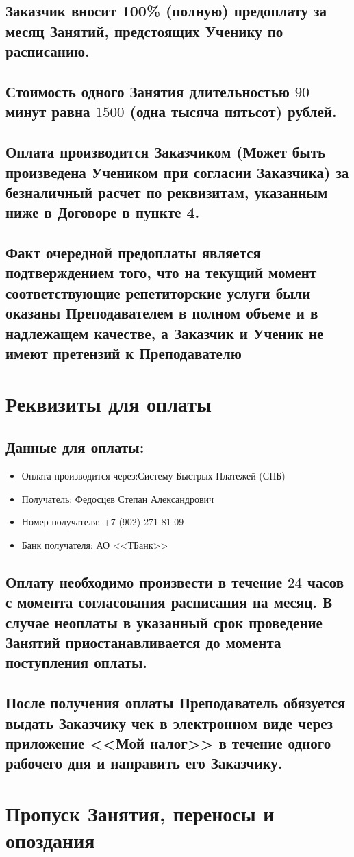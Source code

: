 \documentclass[a4paper,12pt]{article}
\begin{document}
\subsection{Заказчик вносит 100\% (полную) предоплату за месяц Занятий, предстоящих Ученику по расписанию.}
\subsection{Стоимость одного Занятия длительностью $90$ минут равна $1500$ (одна тысяча пятьсот) рублей.}

\subsection{Оплата производится Заказчиком (Может быть произведена Учеником при согласии Заказчика) за безналичный расчет по реквизитам, указанным ниже в Договоре в пункте 4.}
\subsection{Факт очередной предоплаты является подтверждением того, что на текущий момент соответствующие репетиторские услуги были оказаны Преподавателем в полном объеме и в надлежащем качестве, а Заказчик и Ученик не имеют претензий к Преподавателю}
\Large\section{Реквизиты для оплаты}
\subsection{Данные для оплаты:}
\normalsize
\begin{itemize}
    \item Оплата производится через:\hfill Систему Быстрых Платежей (СПБ)
    \item Получатель: \hfill Федосцев Степан Александрович
    \item Номер получателя: \hfill +7 (902) 271-81-09
    \item Банк получателя: \hfill АО <<ТБанк>>
\end{itemize}
\subsection{Оплату необходимо произвести в течение $24$ часов с момента согласования расписания на месяц. В случае неоплаты в указанный срок проведение Занятий приостанавливается до момента поступления оплаты.}
\subsection{После получения оплаты Преподаватель обязуется выдать Заказчику чек в электронном виде через приложение <<Мой налог>> в течение одного рабочего дня и направить его Заказчику.}
\newpage
\Large\section{Пропуск Занятия, переносы  и опоздания}
\end{document}
